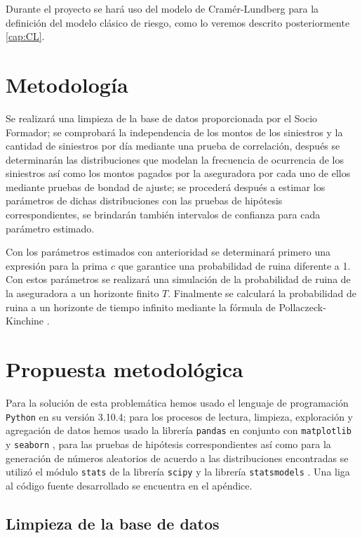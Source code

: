 \documentclass[journal]{IEEEtran}
\begin{document}
        Durante el proyecto se hará uso del modelo de Cramér-Lundberg para la definición del modelo clásico de riesgo, como lo veremos descrito posteriormente \ref{cap:CL}.
        
    \section{Metodología}

        Se realizará una limpieza de la base de datos proporcionada por el Socio Formador; se comprobará la independencia de los montos de los siniestros y la cantidad de siniestros por día mediante una prueba de correlación, después se determinarán las distribuciones que modelan la frecuencia de ocurrencia de los siniestros así como los montos pagados por la aseguradora por cada uno de ellos mediante pruebas de bondad de ajuste; se procederá después a estimar los parámetros de dichas distribuciones con las pruebas de hipótesis correspondientes, se brindarán también intervalos de confianza para cada parámetro estimado.

        Con los parámetros estimados con anterioridad se determinará primero una expresión para la prima $c$ que garantice una probabilidad de ruina diferente a 1. Con estos parámetros se realizará una simulación de la probabilidad de ruina de la aseguradora a un horizonte finito $T$. Finalmente se calculará la probabilidad de ruina a un horizonte de tiempo infinito mediante la fórmula de Pollaczeck-Kinchine \cite{josafat-santana-2020}.
    
    \section{Propuesta metodológica}

        Para la solución de esta problemática hemos usado el lenguaje de programación \texttt{Python} en su versión 3.10.4; para los procesos de lectura, limpieza, exploración y agregación de datos hemos usado la librería \texttt{pandas} \cite{pandas} en conjunto con \texttt{matplotlib} \cite{matplotlib} y \texttt{seaborn} \cite{seaborn}, para las pruebas de hipótesis correspondientes así como para la generación de números aleatorios de acuerdo a las distribuciones encontradas se utilizó el módulo \texttt{stats} de la librería \texttt{scipy} \cite{scipy} y la librería \texttt{statsmodels} \cite{seabold2010statsmodels}. Una liga al código fuente desarrollado se encuentra en el apéndice.

        \subsection{Limpieza de la base de datos}
\end{document}
